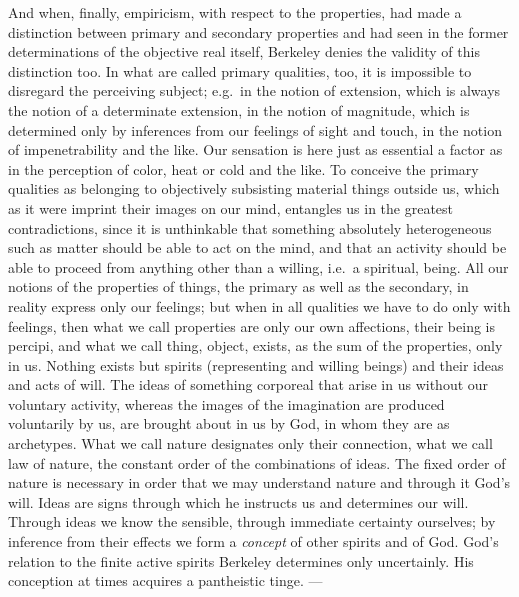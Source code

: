 And when, finally, empiricism, with respect to the properties, had made
a distinction between primary and secondary properties and had seen in
the former determinations of the objective real itself, Berkeley denies
the validity of this distinction too. In what are called primary
qualities, too, it is impossible to disregard the perceiving subject;
e.g.\ in the notion of extension, which is always the notion of a
determinate extension, in the notion of magnitude, which is determined
only by inferences from our feelings of sight and touch, in the notion
of impenetrability and the like. Our sensation is here just as
essential a factor as in the perception of color, heat or cold and the
like. To conceive the primary qualities as belonging to objectively
subsisting material things outside us, which as it were imprint their
images on our mind, entangles us in the greatest contradictions, since
it is unthinkable that something absolutely heterogeneous such as
matter should be able to act on the mind, and that an activity should
be able to proceed from anything other than a willing, i.e.\ a
spiritual, being. All our notions of the properties of things, the
primary as well as the secondary, in reality express only our
feelings; but when in all qualities we have to do only with feelings,
then what we call properties are only our own affections, their being
is percipi, and what we call thing, object, exists, as the sum of the
properties, only in us. Nothing exists but spirits (representing and
willing beings) and their ideas and acts of will. The ideas
of something corporeal that arise in us without our voluntary activity,
whereas the images of the imagination are produced voluntarily by us,
are brought about in us by God, in whom they are as archetypes. What we
call nature designates only their connection, what we call law of
nature, the constant order of the combinations of ideas. The fixed
order of nature is necessary in order that we may understand nature and
through it God's will. Ideas are signs through which he instructs us
and determines our will. Through ideas we know the sensible, through
immediate certainty ourselves; by inference from their effects we form
a \emph{concept} of other spirits and of God. God's relation to the
finite active spirits Berkeley determines only uncertainly. His
conception at times acquires a pantheistic tinge. ---

